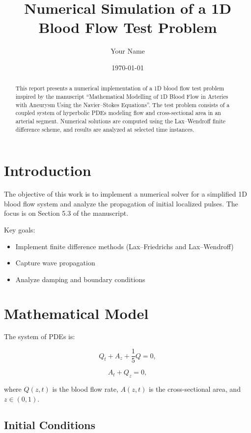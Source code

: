 \documentclass[11pt,a4paper]{article}
\title{Numerical Simulation of a 1D Blood Flow Test Problem}
\author{Your Name}
\date{\today}
\begin{document}
\maketitle

\begin{abstract}
This report presents a numerical implementation of a 1D blood flow test problem inspired by the manuscript ``Mathematical Modelling of 1D Blood Flow in Arteries with Aneurysm Using the Navier--Stokes Equations''. The test problem consists of a coupled system of hyperbolic PDEs modeling flow and cross-sectional area in an arterial segment. Numerical solutions are computed using the Lax--Wendroff finite difference scheme, and results are analyzed at selected time instances.
\end{abstract}

\section{Introduction}

The objective of this work is to implement a numerical solver for a simplified 1D blood flow system and analyze the propagation of initial localized pulses. The focus is on Section 5.3 of the manuscript. 

Key goals:

\begin{itemize}
    \item Implement finite difference methods (Lax--Friedrichs and Lax--Wendroff)
    \item Capture wave propagation
    \item Analyze damping and boundary conditions
\end{itemize}

\section{Mathematical Model}

The system of PDEs is:

\begin{equation}
Q_t + A_z + \frac{1}{5}Q = 0,
\end{equation}

\begin{equation}
A_t + Q_z = 0,
\end{equation}

where $Q(z,t)$ is the blood flow rate, $A(z,t)$ is the cross-sectional area, and $z \in (0,1)$.

\subsection{Initial Conditions}
\end{document}
